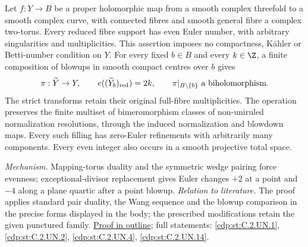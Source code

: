 \hypertarget{main-II-D}{}
\begin{maintheorem}
\hypertarget{tag-03K5}{}\label{series:II:D}
Let $f:Y\to B$ be a proper holomorphic map from a smooth complex
threefold to a smooth complex curve, with connected fibres and
smooth general fibre a complex two-torus. Every reduced fibre
support has even Euler number, with arbitrary singularities and
multiplicities. This assertion imposes no compactness, K\"ahler
or Betti-number condition on $Y$.
For every fixed $b\in B$ and every $k\in\Z$, a finite composition
of blowups in smooth compact centres over $b$ gives
\[
 \pi:\widetilde Y\to Y,
 \qquad e((\widetilde Y_b)_{\rm red})=2k,
 \qquad \pi|_{B\setminus\{b\}}\text{ a biholomorphism}.
\]
The strict transforms retain their original full-fibre
multiplicities. The operation preserves the finite multiset of
bimeromorphism classes of non-uniruled normalization resolutions,
through the induced normalization and blowdown maps. Every such
filling has zero-Euler refinements with arbitrarily many components.
Every even integer also occurs in a smooth projective total space.

\end{maintheorem}

\textit{Mechanism.} Mapping-torus duality and the symmetric wedge
pairing force evenness; exceptional-divisor replacement gives Euler
changes $+2$ at a point and $-4$ along a plane quartic after a point
blowup.
\textit{Relation to literature.} The proof applies standard pair
duality, the Wang sequence and the blowup comparison in the precise
forms displayed in the body; the prescribed modifications retain
the given punctured family.
\hyperlink{outline-II-D}{Proof in outline}; full statements:
\ref{cdp:st:C.2.UN.1}, \ref{cdp:st:C.2.UN.2},
\ref{cdp:st:C.2.UN.4}, \ref{cdp:st:C.2.UN.14}.

